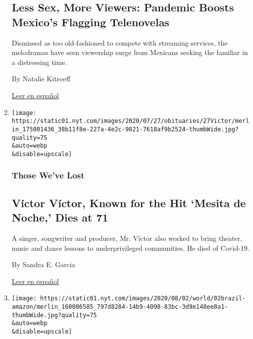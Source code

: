 \begin{enumerate}
{  \subsection{Less Sex, More Viewers: Pandemic Boosts Mexico's Flagging
  Telenovelas}\label{less-sex-more-viewers-pandemic-boosts-mexicos-flagging-telenovelas}}

  Dismissed as too old-fashioned to compete with streaming services, the
  melodramas have seen viewership surge from Mexicans seeking the
  familiar in a distressing time.

  By Natalie Kitroeff

  \href{https://www.nytimes.com/es/2020/08/02/espanol/america-latina/televisa-rosa-de-guadalupe-netflix.html}{Leer
  en español}
\item
  \href{/2020/08/01/obituaries/victor-victor-dead-coronavirus.html}{}

  \texttt{[image: https://static01.nyt.com/images/2020/07/27/obituaries/27Victor/merlin\_175001436\_38b11f8e-227a-4e2c-9821-7618af9b2524-thumbWide.jpg?quality=75\\\&auto=webp\\\&disable=upscale]}

  \hypertarget{those-weve-lost-1}{%
  \subsubsection{Those We've Lost}\label{those-weve-lost-1}}

  \hypertarget{vuxedctor-vuxedctor-known-for-the-hit-mesita-de-noche-dies-at-71}{%
  \subsection{Víctor Víctor, Known for the Hit `Mesita de Noche,' Dies
  at
  71}\label{vuxedctor-vuxedctor-known-for-the-hit-mesita-de-noche-dies-at-71}}

  A singer, songwriter and producer, Mr. Víctor also worked to bring
  theater, music and dance lessons to underprivileged communities. He
  died of Covid-19.

  By Sandra E. Garcia

  \href{https://www.nytimes.com/es/2020/08/03/espanol/cultura/victor-victor-murio-coronavirus.html}{Leer
  en español}
\item
  \href{/2020/08/01/world/americas/Brazil-amazon-deforestation-bolsonaro.html}{}

  \texttt{[image: https://static01.nyt.com/images/2020/08/02/world/02brazil-amazon/merlin\_160086585\_797d8284-14b9-4098-83bc-3d9e148ee8a1-thumbWide.jpg?quality=75\\\&auto=webp\\\&disable=upscale]}


\end{enumerate}
